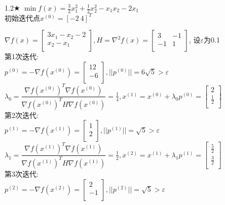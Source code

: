 \begin{problem}{1.2$\bigstar$}
    $\min f(x)=\frac{3}{2}x_1^2+\frac{1}{2}x_2^2-x_1x_2-2x_1$\\
    初始迭代点${x^{(0)}}=[-2\ 4]^T$
\end{problem}
\begin{solution}
    $\nabla f(x)=\begin{bmatrix}
        3x_1-x_2-2  \\
        x_2-x_1  \\
    \end{bmatrix}, H=\nabla^2 f(x)=\begin{bmatrix}
        3   & -1  \\
        -1  & 1  \\
    \end{bmatrix}$,
    设$\varepsilon$为0.1\\
    第1次迭代:\\
    $p^{(0)}=-\nabla f(x^{(0)})=\begin{bmatrix} 12\\-6\\\end{bmatrix},||p^{(0)}||=6\sqrt{5}>\varepsilon$\\
    $\lambda_0=\dfrac{\nabla f(x^{(0)})^T\nabla f(x^{(0)})}{\nabla f(x^{(0)})^TH\nabla f(x^{(0)})}=\frac{1}{4},x^{(1)}=x^{(0)}+\lambda_0p^{(0)}=\begin{bmatrix} 2\\\frac{1}{2}\\\end{bmatrix}$\\
    第2次迭代:\\
    $p^{(1)}=-\nabla f(x^{(1)})=\begin{bmatrix} 1\\2\\\end{bmatrix},||p^{(1)}||=\sqrt{5}>\varepsilon$\\
    $\lambda_1=\dfrac{\nabla f(x^{(1)})^T\nabla f(x^{(1)})}{\nabla f(x^{(1)})^TH\nabla f(x^{(1)})}=\frac{1}{2},x^{(2)}=x^{(1)}+\lambda_1p^{(1)}=\begin{bmatrix} \frac{5}{2}\\\frac{3}{2}\\\end{bmatrix}$\\
    第3次迭代:\\
    $p^{(2)}=-\nabla f(x^{(2)})=\begin{bmatrix} 2\\-1\\\end{bmatrix},||p^{(2)}||=\sqrt{5}>\varepsilon$\\

\end{solution}
